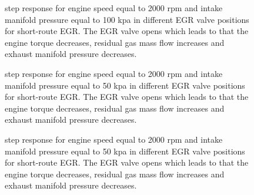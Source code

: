 \begin{figure}[tbp]
  \centering
  \qquad
  \caption{\label{fig:step_response_short_2000_100_2}%
    step response for engine speed equal to 2000 rpm and intake manifold pressure equal to 100 kpa in different EGR valve positions for short-route EGR. The EGR valve opens which leads to that the engine torque decreases, residual gas mass flow increases and exhaust manifold pressure decreases.}
\end{figure}

\begin{figure}[tbp]
  \centering
  \qquad
  \caption{\label{fig:step_response_short_2000_50_1}%
    step response for engine speed equal to 2000 rpm and intake manifold pressure equal to 50 kpa in different EGR valve positions for short-route EGR. The EGR valve opens which leads to that the engine torque decreases, residual gas mass flow increases and exhaust manifold pressure decreases.}
\end{figure}

\begin{figure}[tbp]
  \centering
  \qquad
  \caption{\label{fig:step_response_short_2000_50_2}%
    step response for engine speed equal to 2000 rpm and intake manifold pressure equal to 50 kpa in different EGR valve positions for short-route EGR. The EGR valve opens which leads to that the engine torque decreases, residual gas mass flow increases and exhaust manifold pressure decreases.}
\end{figure}


